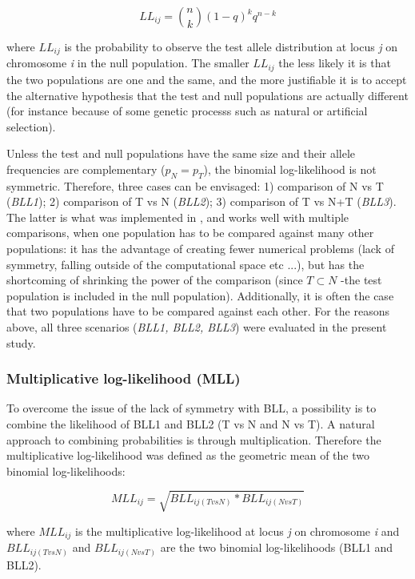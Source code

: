 \documentclass{bmcart}
\begin{document}
\begin{equation}
LL_{ij}={n \choose k} (1-q)^kq^{n-k}
\end{equation}

where $LL_{ij}$ is the probability to observe the test allele
distribution at locus \emph{j} on chromosome \emph{i} in the null population. 
The smaller $LL_{ij}$ the less likely it is that the two populations are
one and the same, and the more justifiable it is to accept the
alternative hypothesis that the test and null populations are actually
different (for instance because of some genetic processs such as natural or
artificial selection). 

Unless the test and null populations have the same size and their allele
frequencies are complementary ($p_N=p_T$), the binomial log-likelihood
is not symmetric. Therefore, three cases can be envisaged: 1) comparison
of N vs T (\emph{BLL1}); 2) comparison of T vs N (\emph{BLL2}); 3)
  comparison of  T vs N+T (\emph{BLL3}). The latter is what was
  implemented in \cite{stella2010identification}, and works well with
  multiple comparisons, when one population has to be compared against
  many other populations: it has the advantage
  of creating fewer numerical problems (lack of symmetry, falling
  outside of the computational space etc ...), but has the shortcoming
  of shrinking the power of the comparison (since $T \subset N$ -the test population is
  included in the null population). Additionally, it is often the case
  that two populations have to be compared against each other. For the
  reasons above, all three scenarios (\emph{BLL1, BLL2, BLL3}) were
  evaluated in the present study.

\subsubsection*{Multiplicative log-likelihood (MLL)}
To overcome the issue of the lack of symmetry with BLL, a
possibility is to combine the likelihood of BLL1 and BLL2 (T vs N
and N vs T). A natural approach to combining probabilities is through
multiplication. Therefore the multiplicative log-likelihood was defined
as the geometric mean of the two binomial log-likelihoods:

\begin{equation}
MLL_{ij} = \sqrt{BLL_{ij(TvsN)}*BLL_{ij(NvsT)}}
\end{equation}

where $MLL_{ij}$ is the multiplicative log-likelihood at locus \emph{j}
on chromosome \emph{i} and $BLL_{ij(TvsN)}$ and $BLL_{ij(NvsT)}$ are the
two binomial log-likelihoods (BLL1 and BLL2).
\end{document}
